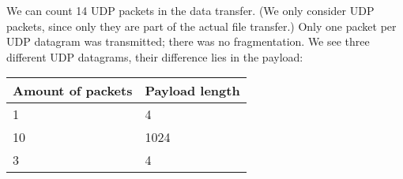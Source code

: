 We can count 14 UDP packets in the data transfer. (We only consider UDP packets, since only they are part of the actual file transfer.) Only one packet per UDP datagram was transmitted; there was no fragmentation.
We see three different UDP datagrams, their difference lies in the payload: \\

\begin{center}
\begin{tabular}{| l | l |}
    \hline
    Amount of packets & Payload length \\ \hline
    1 & 4 \\ \hline
    10 & 1024 \\ \hline
    3 & 4 \\ \hline
\end{tabular}
\end{center}
